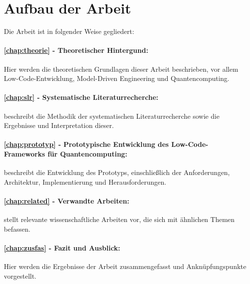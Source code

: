 \section*{Aufbau der Arbeit}

Die Arbeit ist in folgender Weise gegliedert:
\paragraph{\cref{chap:theorie} - Theoretischer Hintergund:} Hier werden die theoretischen Grundlagen dieser Arbeit beschrieben, vor 
allem Low-Code-Entwicklung, Model-Driven Engineering und Quantencomputing.
\paragraph{\cref{chap:slr} - Systematische Literaturrecherche:} beschreibt die Methodik der systematischen Literaturrecherche sowie die Ergebnisse 
und Interpretation dieser.
\paragraph{\cref{chap:prototyp} - Prototypische Entwicklung des Low-Code-Frameworks für Quantencomputing:} beschreibt die 
Entwicklung des Prototyps, einschließlich der Anforderungen, Architektur, Implementierung und Herausforderungen.
\paragraph{\cref{chap:related} - Verwandte Arbeiten:} stellt relevante wissenschaftliche Arbeiten vor, die sich mit ähnlichen Themen befassen.
\paragraph{\cref{chap:zusfas} - Fazit und Ausblick:} Hier werden die Ergebnisse der Arbeit zusammengefasst und Anknüpfungspunkte vorgestellt.
